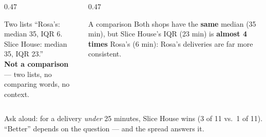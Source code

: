 \documentclass[aspectratio=169, 11pt]{beamer}
\newcommand{\redink}[1]{{\color{redacc}\bfseries #1}}
\begin{document}
\begin{frame}[t, plain]
  \vspace{4pt}
  \begin{columns}[t]
    \begin{column}{0.47\textwidth}
      \begin{block}{Two lists}
        ``Rosa's: median 35, IQR 6. Slice House: median 35, IQR 23.''\\[4pt]
        \redink{Not a comparison} --- two lists, no comparing words, no context.
      \end{block}
    \end{column}
    \begin{column}{0.47\textwidth}
      \begin{block}{A comparison}
        Both shops have the \textbf{same} median (35 min), but Slice House's IQR (23 min) is
        \textbf{almost 4 times} Rosa's (6 min): Rosa's deliveries are far more consistent.
      \end{block}
    \end{column}
  \end{columns}
  \vspace{10pt}
  \begin{center}
    {\small\color{slate} Ask aloud: for a delivery \emph{under} 25 minutes, Slice House wins
    (3 of 11 vs.\ 1 of 11). ``Better'' depends on the question --- and the spread answers it.}
  \end{center}
\end{frame}
\end{document}
